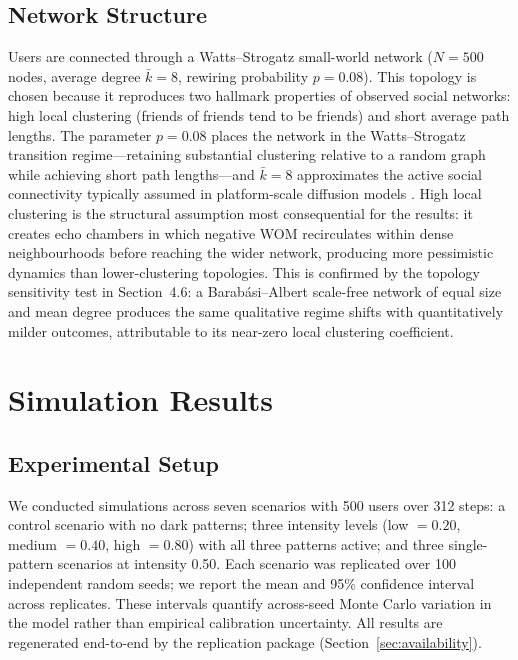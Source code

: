 \documentclass[a4paper]{article}
\begin{document}
\subsection{Network Structure}
Users are connected through a Watts--Strogatz small-world network ($N=500$ nodes, average degree $\bar{k}=8$, rewiring probability $p=0.08$). This topology is chosen because it reproduces two hallmark properties of observed social networks: high local clustering (friends of friends tend to be friends) and short average path lengths. The parameter $p=0.08$ places the network in the Watts--Strogatz transition regime---retaining substantial clustering relative to a random graph while achieving short path lengths---and $\bar{k}=8$ approximates the active social connectivity typically assumed in platform-scale diffusion models \citep{goldenberg2001}. High local clustering is the structural assumption most consequential for the results: it creates echo chambers in which negative WOM recirculates within dense neighbourhoods before reaching the wider network, producing more pessimistic dynamics than lower-clustering topologies. This is confirmed by the topology sensitivity test in Section~4.6: a Barab\'asi--Albert scale-free network of equal size and mean degree produces the same qualitative regime shifts with quantitatively milder outcomes, attributable to its near-zero local clustering coefficient.

\section{Simulation Results}
\subsection{Experimental Setup}
We conducted simulations across seven scenarios with 500  users over 312  steps: a control scenario with no dark patterns; three intensity levels (low $=0.20$, medium $=0.40$, high $=0.80$) with all three patterns active; and three single-pattern scenarios at intensity 0.50. Each scenario was replicated over 100  independent random seeds; we report the mean and 95\% confidence interval across replicates. These intervals quantify across-seed Monte Carlo variation in the model rather than empirical calibration uncertainty. All results are regenerated end-to-end by the replication package (Section~\ref{sec:availability}).
\end{document}
